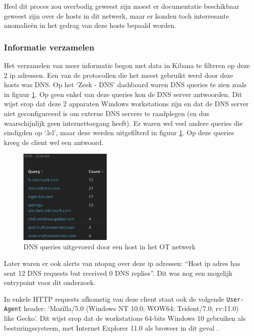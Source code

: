 \documentclass[a4paper, 12pt]{report}
\begin{document}
Heel dit proces zou overbodig geweest zijn moest er documentatie beschikbaar geweest zijn over de hosts in dit netwerk, maar er konden toch interresante anomalieën in het gedrag van deze hosts bepaald worden.

\subsubsection{Informatie verzamelen}
Het verzamelen van meer informatie begon met data in Kibana te filteren op deze 2 ip adressen.
Een van de protocollen die het meest gebruikt werd door deze hosts was DNS.
Op het `Zeek - DNS' dashboard waren DNS queries te zien zoals in figuur \ref{fig:analyse-ot-windows-hosts-dns}.
Op geen enkel van deze queries kon de DNS server antwoorden.
Dit wijst erop dat deze 2 apparaten Windows workstations zijn en dat de DNS server niet geconfigureerd is om externe DNS servers te raadplegen (en dus waarschijnlijk geen internettoegang heeft).
Er waren wel veel andere queries die eindigden op `.lcl', maar deze werden uitgefilterd in figuur \ref{fig:analyse-ot-windows-hosts-dns}.
Op deze queries kreeg de client wel een antwoord.

\begin{figure}[H]
  \centering
  \includegraphics[width=0.4\textwidth]{analyse-ot-windows-hosts-dns}
  \caption{DNS queries uitgevoerd door een host in het OT netwerk}
  \label{fig:analyse-ot-windows-hosts-dns}
\end{figure}

Later waren er ook alerts van ntopng over deze ip adressen: ``Host {ip adres} has sent 12 DNS requests but received 0 DNS replies''.
Dit was nog een mogelijk entrypoint voor dit onderzoek.

In enkele HTTP requests afkomstig van deze client staat ook de volgende \lstinline|User-Agent| header: `Mozilla/5.0 (Windows NT 10.0; WOW64; Trident/7.0; rv:11.0) like Gecko'.
Dit wijst erop dat de workstations 64-bits Windows 10 gebruiken als besturingssysteem, met Internet Explorer 11.0 als browser in dit geval \autocite{user-agent-databases:win10ie}.
\end{document}
